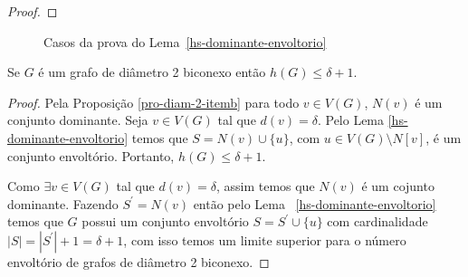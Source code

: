 \begin{proof}
   
\end{proof}

\begin{figure}[h]
\centering
\begin{tikzpicture}

\end{tikzpicture}
\caption{Casos da prova do Lema~\ref{hs-dominante-envoltorio}}
\label{fig-caso-final-hs-dominate}
\end{figure}



\begin{coro}\label{coro-deltinha} Se $G$ é um grafo de diâmetro 2 biconexo então $h(G) \le \delta + 1$.
\end{coro}
\begin{proof}
Pela Proposição \ref{pro-diam-2-itemb} para todo $v \in V(G)$, $N(v)$ é um conjunto dominante. Seja $v \in V(G)$ tal que $d(v)= \delta$. Pelo Lema \ref{hs-dominante-envoltorio} temos que $S=N(v) \cup \{u\}$, com $u \in V(G) \setminus N[v]$, é um conjunto envoltório. Portanto, $h(G) \leq \delta+1$.  

Como $\exists v \in V(G)$ tal que $d(v)=\delta$, assim temos que $N(v)$ é um cojunto dominante. Fazendo $S^\prime=N(v)$ então pelo Lema ~\ref{hs-dominante-envoltorio} temos que $G$ possui um conjunto envoltório $S=S^\prime \cup \{u\}$ com cardinalidade $|S|=|S^\prime|+1=\delta+1$, com isso temos um limite superior para o número envoltório de grafos de diâmetro 2 biconexo. 
\end{proof}

